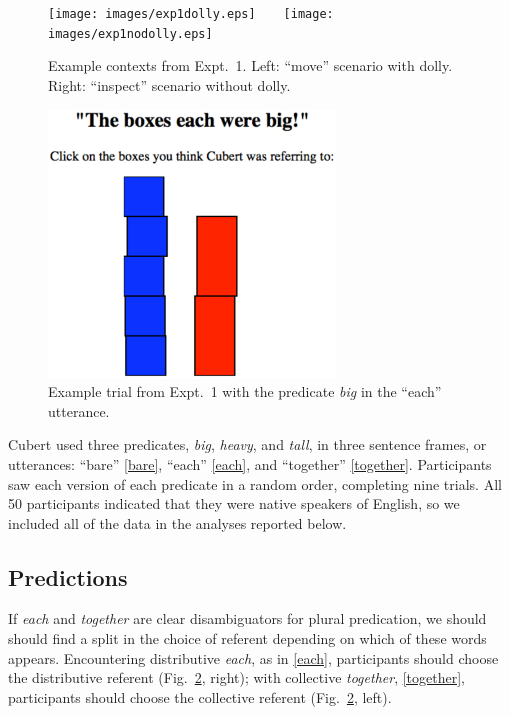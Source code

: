 \documentclass[preprint,12pt,authoryear,titlepage]{elsarticle}
\begin{document}
\begin{figure}[h]
	\centering
	\texttt{[image: images/exp1dolly.eps]}\ \ \ \ 
	\texttt{[image: images/exp1nodolly.eps]}
	\caption{Example contexts from Expt.~1. Left: ``move'' scenario with dolly. Right: ``inspect'' scenario without dolly.}\label{expt1context}
\end{figure}

\begin{figure}[h]
	\centering
	\includegraphics[width=3in]{images/trial2.eps}
	\caption{Example trial from Expt.~1 with the predicate \emph{big} in the ``each'' utterance.}\label{expt1trial}
\end{figure}

Cubert used three predicates, \emph{big}, \emph{heavy}, and \emph{tall}, in three sentence frames, or utterances: ``bare'' \ref{bare}, ``each'' \ref{each}, and ``together'' \ref{together}. Participants saw each version of each predicate in a random order, completing nine trials. All 50 participants indicated that they were native speakers of English, so we included all of the data in the analyses reported below.

\subsection{Predictions}

If \emph{each} and \emph{together} are clear disambiguators for plural predication, we should should find a split in the choice of referent depending on which of these words appears. Encountering distributive \emph{each}, as in \ref{each}, participants should choose the distributive referent (Fig.~\ref{expt1trial}, right); with collective \emph{together}, \ref{together}, participants should choose the collective referent (Fig.~\ref{expt1trial}, left). 
\end{document}
